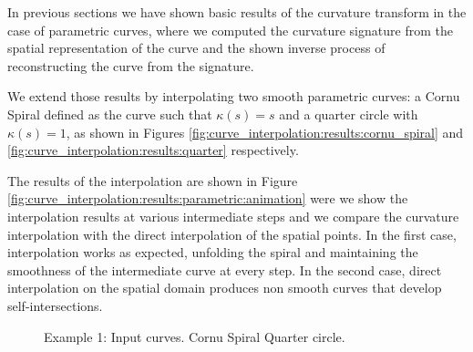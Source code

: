 \documentclass{ipol}
\newcommand{\chapFiveDir}{images/chapter_05a}
\begin{document}
In previous sections we have shown basic results of the curvature transform in the case of parametric curves, where we computed the curvature signature from the spatial representation of the curve and the shown inverse process of reconstructing the curve from the signature.

We extend those results by interpolating two smooth parametric curves: a Cornu Spiral defined as the curve such that $\kappa(s)=s$ and a quarter circle with $\kappa(s)=1$, as shown in Figures \ref{fig:curve_interpolation:results:cornu_spiral} and \ref{fig:curve_interpolation:results:quarter} respectively.

The results of the interpolation are shown in Figure \ref{fig:curve_interpolation:results:parametric:animation} were we show the interpolation results at various intermediate steps and we compare the curvature interpolation with the direct interpolation of the spatial points. In the first case, interpolation works as expected, unfolding the spiral and maintaining the smoothness of the intermediate curve at every step. 
In the second case, direct interpolation on the spatial domain produces non smooth curves that develop self-intersections.

\begin{figure}[h]
	\centering
	\caption{Example 1: Input curves. \protect{} Cornu Spiral \protect{} Quarter circle.}
	\label{fig:curve_interpolation:results:parametric}
\end{figure}	
\end{document}
